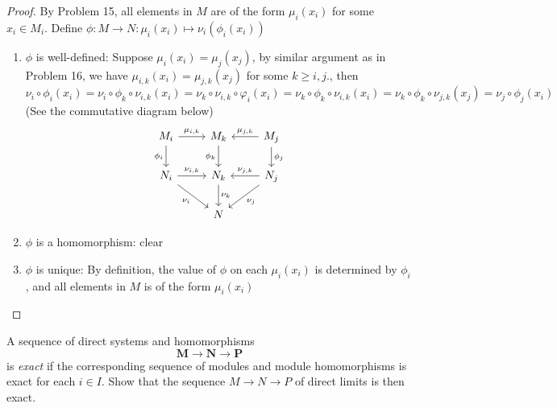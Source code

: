 \documentclass{solution}
\begin{document}
\begin{proof}
    By Problem 15, all elements in $M$ are of the form $\mu_i(x_i)$ for some $x_i \in M_i$. Define $\phi: M \rightarrow N: \mu_i(x_i) \mapsto \nu_i(\phi_i(x_i))$
    
    \begin{enumerate}
        \item $\phi$ is well-defined: Suppose $\mu_i(x_i) = \mu_j(x_j)$, by similar argument as in Problem 16, we have $\mu_{i, k}(x_i) = \mu_{j, k}(x_j)$ for some $k \ge i, j$., then $\nu_i \circ \phi_i(x_i) = \nu_i \circ \phi_k \circ \nu_{i, k} (x_i) = \nu_k \circ \nu_{i, k} \circ \varphi_i (x_i) = \nu_k \circ \phi_k \circ \nu_{i, k}(x_i) = \nu_k \circ \phi_k \circ \nu_{j, k}(x_j) = \nu_j \circ \phi_j(x_i)$ (See the commutative diagram below)
        \[\begin{tikzcd}
            {M_i} & {M_k} & {M_j} \\
            {N_i} & {N_k} & {N_j} \\
            & N
            \arrow["{\mu_{i, k}}", from=1-1, to=1-2]
            \arrow["{\phi_i}"', from=1-1, to=2-1]
            \arrow["{\phi_k}"', from=1-2, to=2-2]
            \arrow["{\mu_{j, k}}"', from=1-3, to=1-2]
            \arrow["{\phi_j}", from=1-3, to=2-3]
            \arrow["{\nu_{i, k}}", from=2-1, to=2-2]
            \arrow["{\nu_i}"', from=2-1, to=3-2]
            \arrow["{\nu_k}", from=2-2, to=3-2]
            \arrow["{\nu_{j, k}}"', from=2-3, to=2-2]
            \arrow["{\nu_j}", from=2-3, to=3-2]
        \end{tikzcd}\]
        \item $\phi$ is a homomorphism: clear
        \item $\phi$ is unique: By definition, the value of $\phi$ on each $\mu_i(x_i)$ is determined by $\phi_i$, and all elements in $M$ is of the form $\mu_i(x_i)$
    \end{enumerate}
\end{proof}

\begin{problem}
    A sequence of direct systems and homomorphisms
    $$\bm{M} \rightarrow \bm{N} \rightarrow \bm{P}$$
    is \textit{exact} if the corresponding sequence of modules and module homomorphisms is exact for each $i \in I$. Show that the sequence $M \rightarrow N \rightarrow P$ of direct limits is then exact.
\end{problem}
\end{document}

